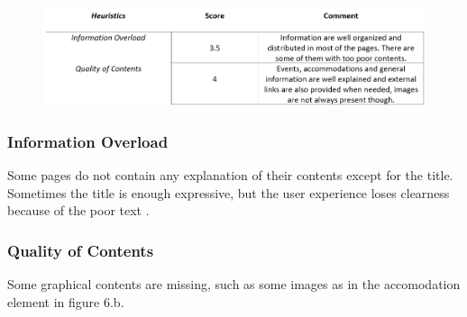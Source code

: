 \begin{figure}[h!]
	\centering
	\begin{minipage}[b]{1\textwidth}
    		\includegraphics[width=\textwidth]{./assets/contents-final.PNG}
	\end{minipage}
\end{figure}
\FloatBarrier

\subsubsection{Information Overload}
Some pages do not contain any explanation of their contents except for the title. Sometimes the title is enough expressive, but the user experience loses clearness because of the poor text .
\FloatBarrier

\subsubsection{Quality of Contents}
Some graphical contents are missing, such as some images as in the accomodation element in figure 6.b.
\begin{figure}[h!]
		\hfill
		\hfill
	\caption{}
\end{figure}



